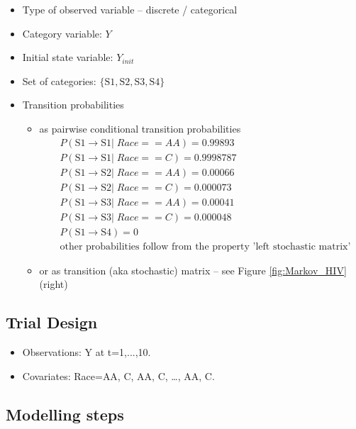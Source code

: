 \begin{itemize}
\item
Type of observed variable -- discrete / categorical
\item
Category variable: $Y$
\item
Initial state variable: $Y_{init}$
\item
Set of categories: $\{\mbox{S1}, \mbox{S2}, \mbox{S3}, \mbox{S4}\}$
\item
Transition probabilities
\begin{itemize}
\item
as pairwise conditional transition probabilities
\begin{align}
& P(\mbox{S1} \rightarrow \mbox{S1} | \; Race==AA) = 0.99893 \nonumber \\
& P(\mbox{S1} \rightarrow \mbox{S1} | \; Race==C) = 0.9998787 \nonumber \\
& P(\mbox{S1} \rightarrow \mbox{S2} | \; Race==AA) = 0.00066 \nonumber \\
& P(\mbox{S1} \rightarrow \mbox{S2} | \; Race==C) = 0.000073 \nonumber \\
& P(\mbox{S1} \rightarrow \mbox{S3} | \; Race==AA) = 0.00041 \nonumber \\
& P(\mbox{S1} \rightarrow \mbox{S3} | \; Race==C) = 0.000048 \nonumber \\
& P(\mbox{S1} \rightarrow \mbox{S4}) = 0 \nonumber \\
& \mbox{other probabilities follow from the property 'left stochastic matrix'} \nonumber
\end{align}
\item
or as transition (aka stochastic) matrix -- see Figure \ref{fig:Markov_HIV} (right)
\end{itemize}
\end{itemize}

\subsection*{Trial Design}

\begin{itemize}
\item
Observations: Y at t=1,...,10.
\item
Covariates: Race={AA, C, AA, C, \dots, AA, C}.
\end{itemize}

\subsection*{Modelling steps}

